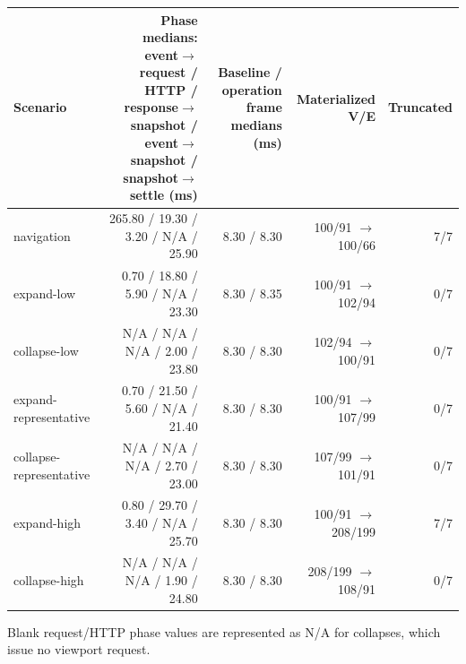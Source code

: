\begin{tabular}{lrrrr}
\hline
Scenario & Phase medians: event\ensuremath{\to}request / HTTP / response\ensuremath{\to}snapshot / event\ensuremath{\to}snapshot / snapshot\ensuremath{\to}settle (ms) & Baseline / operation frame medians (ms) & Materialized V/E & Truncated \\
\hline
navigation & 265.80 / 19.30 / 3.20 / N/A / 25.90 & 8.30 / 8.30 & 100/91 \ensuremath{\to} 100/66 & 7/7 \\
expand-low & 0.70 / 18.80 / 5.90 / N/A / 23.30 & 8.30 / 8.35 & 100/91 \ensuremath{\to} 102/94 & 0/7 \\
collapse-low & N/A / N/A / N/A / 2.00 / 23.80 & 8.30 / 8.30 & 102/94 \ensuremath{\to} 100/91 & 0/7 \\
expand-representative & 0.70 / 21.50 / 5.60 / N/A / 21.40 & 8.30 / 8.30 & 100/91 \ensuremath{\to} 107/99 & 0/7 \\
collapse-representative & N/A / N/A / N/A / 2.70 / 23.00 & 8.30 / 8.30 & 107/99 \ensuremath{\to} 101/91 & 0/7 \\
expand-high & 0.80 / 29.70 / 3.40 / N/A / 25.70 & 8.30 / 8.30 & 100/91 \ensuremath{\to} 208/199 & 7/7 \\
collapse-high & N/A / N/A / N/A / 1.90 / 24.80 & 8.30 / 8.30 & 208/199 \ensuremath{\to} 108/91 & 0/7 \\
\hline
\end{tabular}

\par\smallskip
\footnotesize Blank request/HTTP phase values are represented as N/A for collapses, which issue no viewport request.
